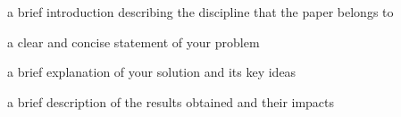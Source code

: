 a brief introduction describing the discipline that the paper belongs to

a clear and concise statement of your problem

a brief explanation of your solution and its key ideas

a brief description of the results obtained and their impacts
